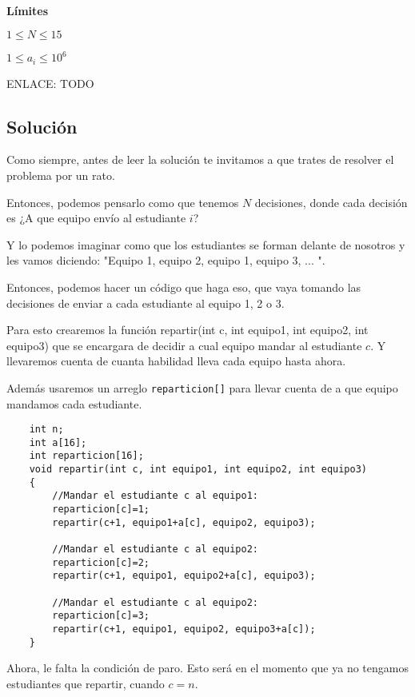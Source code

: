 \textbf{Límites}
\begin{plimits}
	\item \(1\leq N \leq 15\)
	\item \(1\leq a_i \leq 10^6\)
\end{plimits}

ENLACE: TODO

\subsection*{Solución}

Como siempre, antes de leer la solución te invitamos a que trates de resolver el problema por un rato.

Entonces, podemos pensarlo como que tenemos \(N\) decisiones, donde cada decisión es ¿A que equipo envío al estudiante \(i\)?

Y lo podemos imaginar como que los estudiantes se forman delante de nosotros y les vamos diciendo: "Equipo 1, equipo 2, equipo 1, equipo 3, ... ".

Entonces, podemos hacer un código que haga eso, que vaya tomando las decisiones de enviar a cada estudiante al equipo 1, 2 o 3.

Para esto crearemos la función repartir(int c, int equipo1, int equipo2, int equipo3) que se encargara de decidir a cual equipo mandar al estudiante \(c\). 
Y llevaremos cuenta de cuanta habilidad lleva cada equipo hasta ahora.

Además usaremos un arreglo \verb|reparticion[]| para llevar cuenta de a que equipo mandamos cada estudiante.

\pagebreak

\begin{lstlisting}
	int n;
	int a[16];
	int reparticion[16];
	void repartir(int c, int equipo1, int equipo2, int equipo3) 
	{
		//Mandar el estudiante c al equipo1:
		reparticion[c]=1;
		repartir(c+1, equipo1+a[c], equipo2, equipo3);
		
		//Mandar el estudiante c al equipo2:
		reparticion[c]=2;
		repartir(c+1, equipo1, equipo2+a[c], equipo3);
		
		//Mandar el estudiante c al equipo2:
		reparticion[c]=3;
		repartir(c+1, equipo1, equipo2, equipo3+a[c]);
	}
\end{lstlisting}

Ahora, le falta la condición de paro. Esto será en el momento que ya no tengamos estudiantes que repartir, cuando \(c=n\).

